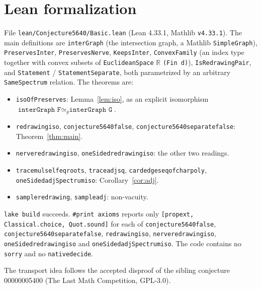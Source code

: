 \documentclass[11pt]{article}
\theoremstyle{definition}
\theoremstyle{remark}
\renewcommand{\_}{\oldus\allowbreak}
\begin{document}
\section{Lean formalization}

File \texttt{lean/Conjecture5640/Basic.lean} (Lean 4.33.1, Mathlib \texttt{v4.33.1}). The main
definitions are \texttt{interGraph} (the intersection graph, a Mathlib \texttt{SimpleGraph}),
\texttt{PreservesInter}, \texttt{PreservesNerve}, \texttt{KeepsInter}, \texttt{ConvexFamily} (an
index type together with convex subsets of \texttt{EuclideanSpace} $\mathbb{R}$ \texttt{(Fin d)}),
\texttt{IsRedrawingPair}, and \texttt{Statement} / \texttt{StatementSeparate}, both parametrized
by an arbitrary \texttt{SameSpectrum} relation. The theorems are:
\begin{itemize}
\item \texttt{isoOfPreserves}: Lemma~\ref{lem:iso}, as an explicit isomorphism
$\texttt{interGraph F}\simeq_g\texttt{interGraph G}$.
\item \texttt{redrawing\_iso}, \texttt{conjecture5640\_false},
\texttt{conjecture5640\_separate\_false}: Theorem~\ref{thm:main}.
\item \texttt{nerve\_redrawing\_iso}, \texttt{oneSided\_redrawing\_iso}: the other two readings.
\item \texttt{trace\_mul\_self\_eq\_roots}, \texttt{trace\_adj\_sq},
\texttt{card\_edges\_eq\_of\_charpoly}, \texttt{oneSided\_adjSpectrum\_iso}:
Corollary~\ref{cor:adj}.
\item \texttt{sample\_redrawing}, \texttt{sample\_adj}: non-vacuity.
\end{itemize}
\texttt{lake build} succeeds. \texttt{\#print axioms} reports only \texttt{[propext,
Classical.choice, Quot.sound]} for each of \texttt{conjecture5640\_false},
\texttt{conjecture5640\_separate\_false}, \texttt{redrawing\_iso}, \texttt{nerve\_redrawing\_iso},
\texttt{oneSided\_redrawing\_iso} and \texttt{oneSided\_adjSpectrum\_iso}. The code contains no
\texttt{sorry} and no
\texttt{native\_decide}.

The transport idea follows the accepted disproof of the sibling conjecture 00000005400 (The Last
Math Competition, GPL-3.0).
\end{document}
